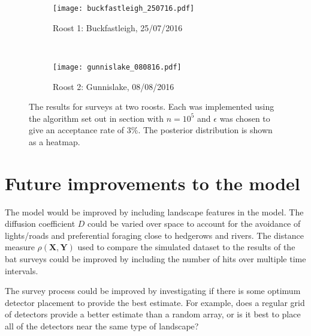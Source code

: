 \begin{figure} [h]
    \centering
    \begin{subfigure}[b]{\ttp}
        \texttt{[image: buckfastleigh\_250716.pdf]}
        \caption{Roost 1: Buckfastleigh, 25/07/2016}
        \label{fig:buckfastleigh_250716}
    \end{subfigure}
    ~ %
    \begin{subfigure}[b]{\ttp}
        \texttt{[image: gunnislake\_080816.pdf]}
        \caption{Roost 2: Gunnislake, 08/08/2016}
        \label{fig:gunnislake_080816}
    \end{subfigure}
    \caption{The results for surveys at two roosts. Each was implemented using the algorithm set out in section  with $n=10^5$ and $\epsilon$ was chosen to give an acceptance rate of 3\%. The posterior distribution is shown as a heatmap.}\label{fig:fixed_D}
\end{figure}


\section{Future improvements to the model}

The model would be improved by including landscape features in the model. The
diffusion coefficient $D$ could be varied over space to account for the
avoidance of lights/roads and preferential foraging close to hedgerows and
rivers. The distance measure $\rho(\bm{X}, \bm{Y})$ used to compare the
simulated dataset to the results of the bat surveys could be improved by
including the number of hits over multiple time intervals.

The survey process could be improved by investigating if there is some optimum
detector placement to provide the best estimate. For example, does a regular
grid of detectors provide a better estimate than a random array, or is it best
to place all of the detectors near the same type of landscape?



